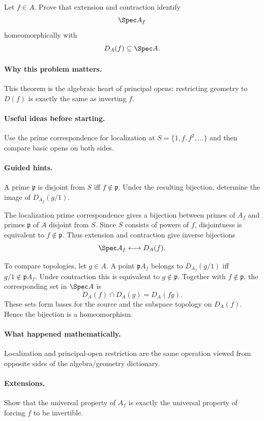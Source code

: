 \begin{problem}
Let $f\in A$.  Prove that extension and contraction identify
\[
\Spec A_f
\]
homeomorphically with
\[
D_A(f)\subseteq\Spec A.
\]
\end{problem}

\paragraph{Why this problem matters.}
This theorem is the algebraic heart of principal opens: restricting geometry to $D(f)$ is
exactly the same as inverting $f$.

\paragraph{Useful ideas before starting.}
Use the prime correspondence for localization at
$S=\{1,f,f^2,\dots\}$ and then compare basic opens on both sides.

\paragraph{Guided hints.}
A prime $\mathfrak p$ is disjoint from $S$ iff $f\notin\mathfrak p$.  Under the resulting
bijection, determine the image of $D_{A_f}(g/1)$.

\begin{solution}
The localization prime correspondence gives a bijection between primes of $A_f$ and primes
$\mathfrak p$ of $A$ disjoint from $S$.  Since $S$ consists of powers of $f$, disjointness
is equivalent to $f\notin\mathfrak p$.  Thus extension and contraction give inverse
bijections
\[
\Spec A_f\longleftrightarrow D_A(f).
\]

To compare topologies, let $g\in A$.  A point $\mathfrak pA_f$ belongs to
$D_{A_f}(g/1)$ iff $g/1\notin\mathfrak pA_f$.  Under contraction this is equivalent to
$g\notin\mathfrak p$.  Together with $f\notin\mathfrak p$, the corresponding set in
$\Spec A$ is
\[
D_A(f)\cap D_A(g)=D_A(fg).
\]
These sets form bases for the source and the subspace topology on $D_A(f)$.  Hence the
bijection is a homeomorphism.
\end{solution}

\paragraph{What happened mathematically.}
Localization and principal-open restriction are the same operation viewed from opposite
sides of the algebra/geometry dictionary.

\paragraph{Extensions.}
Show that the universal property of $A_f$ is exactly the universal property of forcing $f$
to be invertible.
